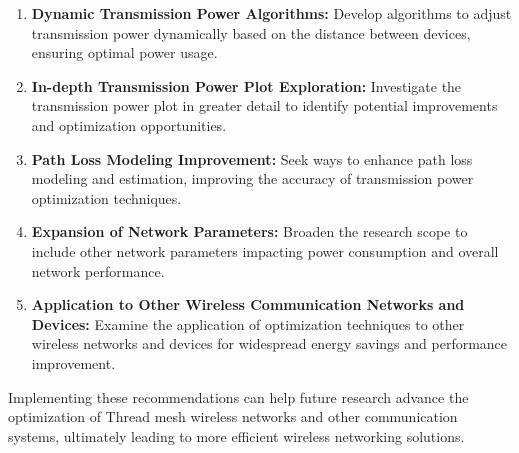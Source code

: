 \vspace{2mm}
\begin{enumerate}
    \item \textbf{Dynamic Transmission Power Algorithms:} Develop algorithms to adjust transmission power dynamically based on the distance between devices, ensuring optimal power usage.
    \item \textbf{In-depth Transmission Power Plot Exploration:} Investigate the transmission power plot in greater detail to identify potential improvements and optimization opportunities.
    \item \textbf{Path Loss Modeling Improvement:} Seek ways to enhance path loss modeling and estimation, improving the accuracy of transmission power optimization techniques.
    \item \textbf{Expansion of Network Parameters:} Broaden the research scope to include other network parameters impacting power consumption and overall network performance.
    \item \textbf{Application to Other Wireless Communication Networks and Devices:} Examine the application of optimization techniques to other wireless networks and devices for widespread energy savings and performance improvement.
\end{enumerate}
\vspace{3mm}

Implementing these recommendations can help future research advance the optimization of Thread mesh wireless networks and other communication systems, ultimately leading to more efficient wireless networking solutions.
